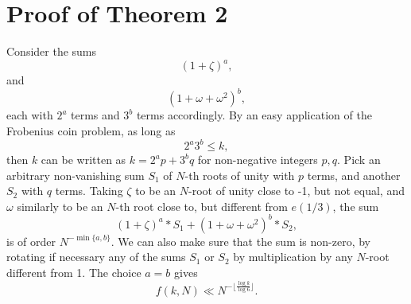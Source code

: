 \documentclass[12pt]{article}
\theoremstyle{definition}
\begin{document}
\section{Proof of Theorem 2}
Consider the sums
\begin{equation}
    (1+\zeta)^a,
\end{equation}
and
\begin{equation}\label{sum1}
    (1+\omega+\omega^2)^b,
\end{equation}
each with $2^a$ terms and $3^b$ terms accordingly. By an easy application of the Frobenius coin problem, as long as
\begin{equation}\label{sum2}
    2^a3^b\leq k,
\end{equation} 
then $k$ can be written as $k=2^ap+3^bq$ for non-negative integers $p,q$. Pick an arbitrary non-vanishing sum $S_1$ of $N$-th roots of unity with $p$ terms, and another $S_2$ with $q$ terms. Taking $\zeta$ to be an $N$-root of unity close to -1, but not equal, and $\omega$ similarly to be an $N$-th root close to, but different from $e(1/3)$, the sum
$$ (1+\zeta)^a*S_1+(1+\omega+\omega^2)^b*S_2,  $$
is of order $N^{-\min\{a,b\}}$. We can also make sure that the sum is non-zero, by rotating if necessary any of the sums $S_1$ or $S_2$ by multiplication by any $N$-root different from 1. The choice $a=b$ gives
$$ f(k,N)\ll N^{-\lfloor \frac{\log k}{\log 6} \rfloor}.  $$
\end{document}
